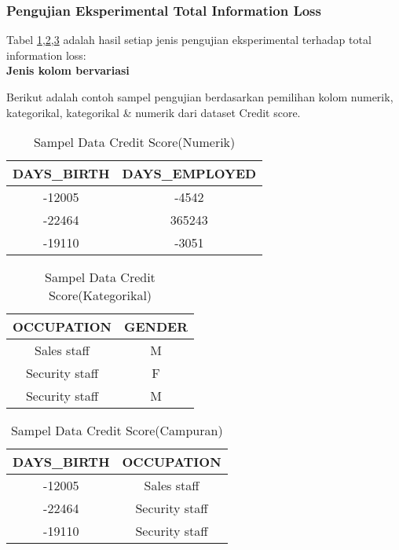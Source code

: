 \newpage
\subsubsection{Pengujian Eksperimental Total Information Loss} 

Tabel \ref{table:column1},\ref{table:column2},\ref{table:column3} adalah hasil setiap jenis pengujian eksperimental terhadap total information loss:\\

\textbf{Jenis kolom bervariasi}\\

\begin{minipage}[t]{15.8cm}
Berikut adalah contoh sampel pengujian berdasarkan pemilihan kolom numerik, kategorikal, kategorikal \& numerik dari dataset Credit score.
\end{minipage}

\begin{table}[h]
\centering
\caption{Sampel Data Credit Score(Numerik)}
\vspace{0.2cm}
\begin{tabular}{|c|c|}
\hline 
DAYS\_BIRTH & DAYS\_EMPLOYED \\ 
\hline 
-12005 & -4542 \\ 
\hline 
-22464 & 365243 \\ 
\hline 
-19110 & -3051 \\ 
\hline 
\end{tabular} 
\label{table:column1}
\end{table} 

\begin{table}[h]
\centering
\caption{Sampel Data Credit Score(Kategorikal)}
\vspace{0.2cm}
\begin{tabular}{|c|c|}
\hline 
OCCUPATION & GENDER \\ 
\hline 
Sales staff & M \\ 
\hline 
Security staff & F \\ 
\hline 
Security staff & M \\ 
\hline 
\end{tabular} 
\label{table:column2}
\end{table} 

\begin{table}[h]
\centering
\caption{Sampel Data Credit Score(Campuran)}
\vspace{0.2cm}
\begin{tabular}{|c|c|}
\hline 
DAYS\_BIRTH & OCCUPATION \\ 
\hline 
-12005 & Sales staff \\ 
\hline 
-22464 & Security staff \\ 
\hline 
-19110 & Security staff \\ 
\hline 
\end{tabular} 
\label{table:column3}
\end{table} 

